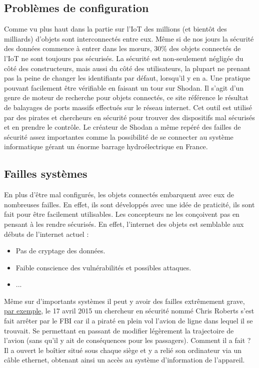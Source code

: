 \documentclass[a4paper]{report}
\begin{document}
	\subsection{Problèmes de configuration}
	Comme vu plus haut dans la partie sur l'IoT des millions (et bientôt des milliards) d'objets sont interconnectés entre eux. Même si
	de nos jours la sécurité des données commence à entrer dans les mœurs, 30\% des objets connectés de l'IoT ne sont toujours pas sécurisés.
	La sécurité est non-seulement négligée du côté des constructeurs, mais aussi du côté des utilisateurs, la plupart ne prenant pas la
	peine de changer les identifiants par défaut, lorsqu'il y en a. Une pratique pouvant facilement être vérifiable en faisant un tour sur 
	Shodan. Il s'agit d'un genre de moteur de recherche pour objets connectés, ce site référence le résultat de balayages de ports massifs
	effectués sur le réseau internet. Cet outil est utilisé par des pirates et chercheurs en sécurité pour trouver des dispositifs mal
	sécurisés et en prendre le contrôle. Le créateur de Shodan a même repéré des failles de sécurité assez importantes comme la possibilité
	de se connecter au système informatique gérant un énorme barrage hydroélectrique en France.
	
	\subsection{Failles systèmes}
	En plus d'être mal configurés, les objets connectés embarquent avec eux de nombreuses failles. En effet, ils sont développés avec
	une idée de praticité, ils sont fait pour être facilement utilisables. Les concepteurs ne les conçoivent pas en pensant à les rendre
	sécurisés. En effet, l'internet des objets est semblable aux débuts de l'internet actuel :
	\medbreak
	\begin{itemize}
		\item Pas de cryptage des données.
		\item Faible conscience des vulnérabilités et possibles attaques.
		\item ...
	\end{itemize}
	\smallbreak
	Même sur d'importants systèmes il peut y avoir des failles extrêmement grave, 
	\href{https://www.objetconnecte.com/les-objets-connectes-un-risque-de-cybersecurite-majeur-dans-lentreprise-2310/}{par exemple}, 
	le 17 avril 2015 un chercheur en sécurité nommé Chris Roberts s'est fait arrêter par le FBI car il a piraté en plein vol l'avion
	de ligne dans lequel il se trouvait. Se permettant en passant de modifier légèrement la trajectoire de l'avion (sans qu'il y ait
	de conséquences pour les passagers). Comment il a fait ? Il a ouvert le boîtier situé sous chaque siège et y a relié son ordinateur via
	un câble ethernet, obtenant ainsi un accès au système d'information de l'appareil.
	
\end{document}
